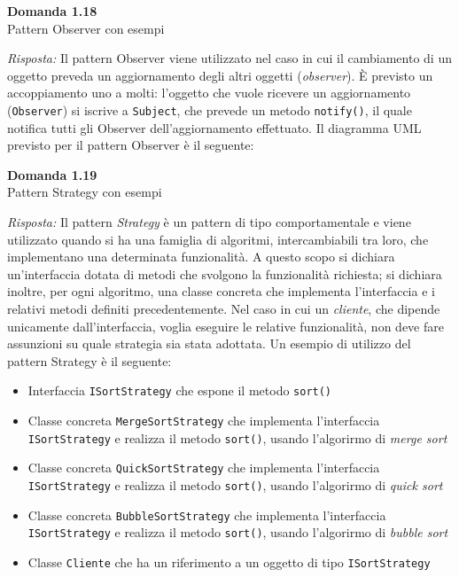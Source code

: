 \documentclass{article}
\newenvironment{problem}[2][Domanda]
    { \begin{mdframed}[backgroundcolor=gray!20] \textbf{#1 #2} \\}
    {  \end{mdframed}}
\newenvironment{solution}
    {\textit{Risposta:}}
    {}
\begin{document}
\newpage
\begin{problem}{1.18}
Pattern Observer con esempi
\end{problem}
\begin{solution}
Il pattern Observer viene utilizzato nel caso in cui il cambiamento di un oggetto preveda un aggiornamento degli altri oggetti (\textit{observer}).
È previsto un accoppiamento uno a molti: l'oggetto che vuole ricevere un aggiornamento (\texttt{Observer}) si iscrive a \texttt{Subject}, che prevede un metodo \texttt{notify()}, il quale notifica tutti gli Observer dell'aggiornamento effettuato.
Il diagramma UML previsto per il pattern Observer è il seguente:
\end{solution}


\begin{problem}{1.19}
Pattern Strategy con esempi
\end{problem}
\begin{solution}
Il pattern \textit{Strategy} è un pattern di tipo comportamentale e viene utilizzato quando si ha una famiglia di algoritmi, intercambiabili tra loro, che implementano una determinata funzionalità.
A questo scopo si dichiara un'interfaccia dotata di metodi che svolgono la funzionalità richiesta; si dichiara inoltre, per ogni algoritmo, una classe concreta che implementa l'interfaccia e i relativi metodi definiti precedentemente.
\newline
Nel caso in cui un \textit{cliente}, che dipende unicamente dall'interfaccia, voglia eseguire le relative funzionalità, non deve fare assunzioni su quale strategia sia stata adottata.
\newline
Un esempio di utilizzo del pattern Strategy è il seguente:
\begin{itemize}
	\item Interfaccia \texttt{ISortStrategy} che espone il metodo \texttt{sort()}
	\item Classe concreta \texttt{MergeSortStrategy} che implementa l'interfaccia \texttt{ISortStrategy} e realizza il metodo \texttt{sort()}, usando l'algorirmo di \textit{merge sort}
	\item Classe concreta \texttt{QuickSortStrategy} che implementa l'interfaccia \texttt{ISortStrategy} e realizza il metodo \texttt{sort()}, usando l'algorirmo di \textit{quick sort}
	\item Classe concreta \texttt{BubbleSortStrategy} che implementa l'interfaccia \texttt{ISortStrategy} e realizza il metodo \texttt{sort()}, usando l'algorirmo di \textit{bubble sort}
	\item Classe \texttt{Cliente} che ha un riferimento a un oggetto di tipo \texttt{ISortStrategy}
\end{itemize}
\end{solution}
\end{document}
